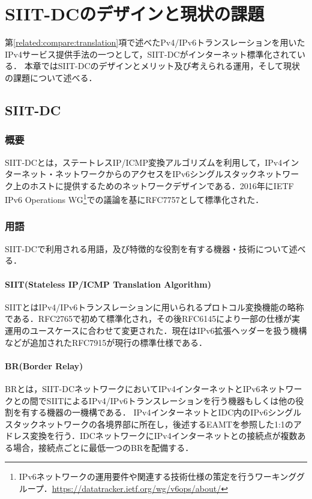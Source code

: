 \chapter{SIIT-DCのデザインと現状の課題}
\label{issue}
第\ref{related:compare:translation}項で述べたPv4/IPv6トランスレーションを用いたIPv4サービス提供手法の一つとして，SIIT-DCがインターネット標準化されている．
本章ではSIIT-DCのデザインとメリット及び考えられる運用，そして現状の課題について述べる．
\section{SIIT-DC}
\label{issue:siit-dc}


\subsection{概要}
SIIT-DCとは，ステートレスIP/ICMP変換アルゴリズム\cite{RFC7915}を利用して，IPv4インターネット・ネットワークからのアクセスをIPv6シングルスタックネットワーク上のホストに提供するためのネットワークデザインである．2016年にIETF IPv6 Operations WG\footnote{IPv6ネットワークの運用要件や関連する技術仕様の策定を行うワーキンググループ．\url{https://datatracker.ietf.org/wg/v6ops/about/}}での議論を基にRFC7757として標準化された\cite{RFC7755}．


\subsection{用語}
\label{issue:siit-dc:terms}
SIIT-DCで利用される用語，及び特徴的な役割を有する機器・技術について述べる．

\subsubsection{SIIT(Stateless IP/ICMP Translation Algorithm)}
SIITとはIPv4/IPv6トランスレーションに用いられるプロトコル変換機能の略称である．RFC2765\cite{RFC2765}で初めて標準化され，その後RFC6145\cite{RFC6145}により一部の仕様が実運用のユースケースに合わせて変更された．現在はIPv6拡張ヘッダーを扱う機構などが追加されたRFC7915\cite{RFC7915}が現行の標準仕様である．

\subsubsection{BR(Border Relay)}
BRとは，SIIT-DCネットワークにおいてIPv4インターネットとIPv6ネットワークとの間でSIITによるIPv4/IPv6トランスレーションを行う機器もしくは他の役割を有する機器の一機構である．
IPv4インターネットとIDC内のIPv6シングルスタックネットワークの各境界部に所在し，後述するEAMTを参照した1:1のアドレス変換を行う．IDCネットワークにIPv4インターネットとの接続点が複数ある場合，接続点ごとに最低一つのBRを配備する．

